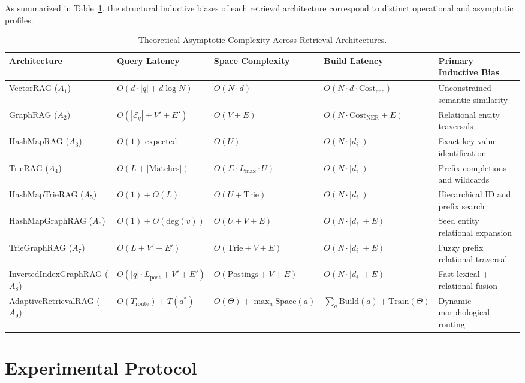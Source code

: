 \documentclass[10pt,twocolumn,letterpaper]{article}
\begin{document}
As summarized in Table~\ref{tab:complexity}, the structural inductive biases of each retrieval architecture correspond to distinct operational and asymptotic profiles.

\begin{table}[t]
\centering
\small
\caption{Theoretical Asymptotic Complexity Across Retrieval Architectures.}
\label{tab:complexity}
\begin{tabular}{lllll}
\toprule
\textbf{Architecture} & \textbf{Query Latency} & \textbf{Space Complexity} & \textbf{Build Latency} & \textbf{Primary Inductive Bias} \\
\midrule
VectorRAG ($A_1$) & $O(d \cdot |q| + d \log N)$ & $O(N \cdot d)$ & $O(N \cdot d \cdot \text{Cost}_{\text{enc}})$ & Unconstrained semantic similarity \\
GraphRAG ($A_2$) & $O(|\mathcal{E}_q| + V' + E')$ & $O(V + E)$ & $O(N \cdot \text{Cost}_{\text{NER}} + E)$ & Relational entity traversals \\
HashMapRAG ($A_3$) & $O(1)$ expected & $O(U)$ & $O(N \cdot |d_i|)$ & Exact key-value identification \\
TrieRAG ($A_4$) & $O(L + |\text{Matches}|)$ & $O(\Sigma \cdot L_{\max} \cdot U)$ & $O(N \cdot |d_i|)$ & Prefix completions and wildcards \\
HashMapTrieRAG ($A_5$) & $O(1) + O(L)$ & $O(U + \text{Trie})$ & $O(N \cdot |d_i|)$ & Hierarchical ID and prefix search \\
HashMapGraphRAG ($A_6$) & $O(1) + O(\text{deg}(v))$ & $O(U + V + E)$ & $O(N \cdot |d_i| + E)$ & Seed entity relational expansion \\
TrieGraphRAG ($A_7$) & $O(L + V' + E')$ & $O(\text{Trie} + V + E)$ & $O(N \cdot |d_i| + E)$ & Fuzzy prefix relational traversal \\
InvertedIndexGraphRAG ($A_8$) & $O(|q| \cdot \bar{L}_{\text{post}} + V' + E')$ & $O(\text{Postings} + V + E)$ & $O(N \cdot |d_i| + E)$ & Fast lexical + relational fusion \\
AdaptiveRetrievalRAG ($A_9$) & $O(T_{\text{route}}) + T(a^*)$ & $O(\Theta) + \max_a \text{Space}(a)$ & $\sum_a \text{Build}(a) + \text{Train}(\Theta)$ & Dynamic morphological routing \\
\bottomrule
\end{tabular}
\end{table}

\section{Experimental Protocol}
\end{document}

